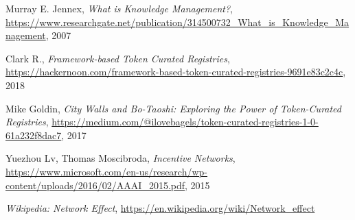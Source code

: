 \documentclass[10pt,a4paper]{article}
\begin{document}
\begin{thebibliography}{9}

    Murray E. Jennex,
    \textit{What is Knowledge Management?},
    \url{https://www.researchgate.net/publication/314500732_What_is_Knowledge_Management},
    2007 

    Clark R.,
    \textit{Framework-based Token Curated Registries},
    \url{https://hackernoon.com/framework-based-token-curated-registries-9691e83c2c4c},
    2018


    Mike Goldin,
    \textit{City Walls and Bo-Taoshi: Exploring the Power of Token-Curated Registries},
    \url{https://medium.com/@ilovebagels/token-curated-registries-1-0-61a232f8dac7},
    2017

    Yuezhou Lv, Thomas Moscibroda,
    \textit{Incentive Networks},
    \url{https://www.microsoft.com/en-us/research/wp-content/uploads/2016/02/AAAI_2015.pdf},
    2015

    \textit{Wikipedia: Network Effect},
    \url{https://en.wikipedia.org/wiki/Network_effect}

\end{thebibliography}
\end{document}
